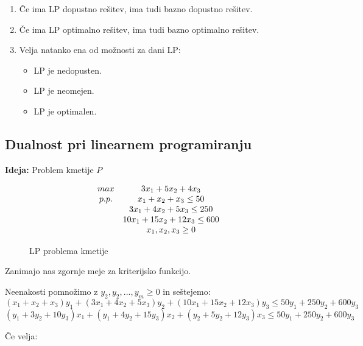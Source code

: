 \documentclass[11pt, a4paper]{article}
\begin{document}
    \begin{theorem}
        \begin{enumerate}
            \item Če ima LP dopustno rešitev, ima tudi bazno dopustno rešitev.
            \item Če ima LP optimalno rešitev, ima tudi bazno optimalno rešitev.
            \item Velja natanko ena od možnosti za dani LP:
            \begin{itemize}
                \item LP je nedopusten.
                \item LP je neomejen.
                \item LP je optimalen.
            \end{itemize}
        \end{enumerate}
    \end{theorem}
    \clearpage



    \subsection{Dualnost pri linearnem programiranju}

    \textbf{Ideja:} Problem kmetije \(P\)
    \begin{figure}[h!]
        \[
            \begin{array}{ c c }
                max & 3x_1+5x_2+4x_3 \\
                p.p. & x_1+x_2+x_3 \le 50 \\
                & 3x_1+4x_2+5x_3 \le 250 \\
                & 10x_1+15x_2+12x_3 \le 600 \\
                & x_1,x_2,x_3 \ge 0 \\
            \end{array}
        \]
        \caption{LP problema kmetije}
    \end{figure}

    Zanimajo nas zgornje meje za kriterijsko funkcijo. 
    \par
    Neenakosti pomnožimo z \(y_2,y_2,...,y_m \ge 0\) in seštejemo:
    \[(x_1+x_2+x_3)y_1+(3x_1+4x_2+5x_3)y_2+(10x_1+15x_2+12x_3)y_3 \le 50y_1+250y_2+600y_3\]
    \[(y_1+3y_2+10y_3)x_1+(y_1+4y_2+15y_3)x_2+(y_2+5y_2+12y_3)x_3 \le 50y_1+250y_2+600y_3\]
    
    Če velja:
    
\end{document}
